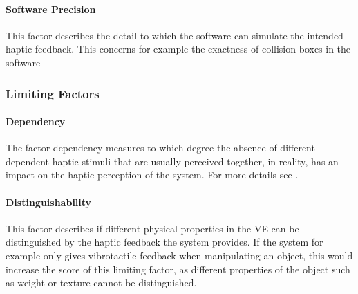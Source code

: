 \paragraph{Software Precision}
This factor describes the detail to which the software can simulate the intended haptic feedback. This concerns for example the exactness of collision boxes in the software \cite{Muender2022HapticReality}

\subsubsection{Limiting Factors}
\paragraph{Dependency}
The factor dependency measures to which degree the absence of different dependent haptic stimuli that are usually perceived together, in reality, has an impact on the haptic perception of the system. For more details see \cite{Muender2022HapticReality}.

\paragraph{Distinguishability}
This factor describes if different physical properties in the VE can be distinguished by the haptic feedback the system provides. If the system for example only gives vibrotactile feedback when manipulating an object, this would increase the score of this limiting factor, as different properties of the object such as weight or texture cannot be distinguished. 

